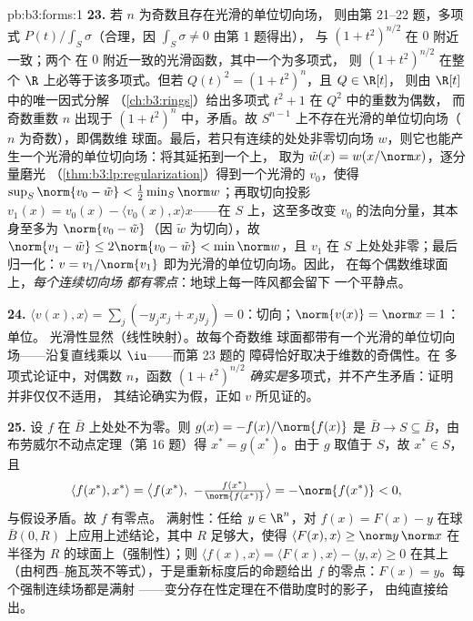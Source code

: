 \begin{solution}{pb:b3:forms:1}
\textbf{23.} 若 $n$ 为奇数且存在光滑的单位切向场，
则由第 21--22 题，多项式
$P(t)/\int_S\sigma$（合理，因 $\int_S\sigma \neq 0$ 由第 1 题得出），
与 $(1 + t^2)^{n/2}$ 在 $0$ 附近一致；两个
在 $0$ 附近一致的光滑函数，其中一个为多项式，
则 $(1 + t^2)^{n/2}$ 在整个
$\R$ 上必等于该多项式。但若 $Q(t)^2 = (1 + t^2)^n$，且 $Q \in \R[t]$，
则由 $\R[t]$ 中的唯一因式分解
（\cref{ch:b3:rings}）给出多项式 $t^2 + 1$ 在 $Q^2$ 中的重数为偶数，
而奇数重数 $n$ 出现于
$(1 + t^2)^n$ 中，矛盾。故
$S^{n-1}$ 上不存在光滑的单位切向场（$n$ 为奇数），即偶数维
球面。最后，若只有连续的处处非零切向场
$w$，则它也能产生一个光滑的单位切向场：将其延拓到一个上，
取为 $\tilde w(x) = w(x/\norm x)$，逐分量磨光
（\cref{thm:b3:lp:regularization}）得到一个光滑的
$v_0$，使得 $\sup_S\norm{v_0 - \tilde w} <
\frac12\min_S\norm w$；再取切向投影 $v_1(x) = v_0(x)
- \langle v_0(x), x\rangle x$——在 $S$ 上，这至多改变 $v_0$
的法向分量，其本身至多为 $\norm{v_0 -
\tilde w}$（因 $\tilde w$ 为切向），故 $\norm{v_1 - \tilde
w} \leq 2\norm{v_0 - \tilde w} < \min\norm w$，且 $v_1$
在 $S$ 上处处非零；最后归一化：$v =
v_1/\norm{v_1}$ 即为光滑的单位切向场。因此，
在每个偶数维球面上，\emph{每个连续切向场
都有零点}：地球上每一阵风都会留下
一个平静点。

\textbf{24.} $\langle v(x), x\rangle = \sum_j(-y_jx_j +
x_jy_j) = 0$：切向；$\norm{v(x)} = \norm x = 1$：单位。
光滑性显然（线性映射）。故每个奇数维
球面都带有一个光滑的单位切向场——沿复直线乘以
$\iu$——而第 23 题的
障碍恰好取决于维数的奇偶性。在
多项式论证中，对偶数 $n$，函数 $(1 +
t^2)^{n/2}$ \emph{确实是}多项式，并不产生矛盾：证明
并非仅仅不适用，
其结论确实为假，正如 $v$ 所见证的。

\textbf{25.} 设 $f$ 在 $\bar B$ 上处处不为零。则
$g(x) = -f(x)/\norm{f(x)}$ 是 $\bar B \to S
\subseteq \bar B$，由布劳威尔不动点定理（第 16 题）得 $x^* =
g(x^*)$。由于 $g$ 取值于 $S$，故 $x^* \in S$，且
\[
\langle f(x^*), x^*\rangle = \bigl\langle f(x^*),\
-\tfrac{f(x^*)}{\norm{f(x^*)}}\bigr\rangle
= -\norm{f(x^*)} < 0,
\]
与假设矛盾。故 $f$ 有零点。
满射性：任给 $y \in \R^n$，对 $f(x) =
F(x) - y$ 在球 $\bar B(0, R)$ 上应用上述结论，其中 $R$ 足够大，使得
$\langle F(x), x\rangle \geq \norm y\,\norm x$ 在半径为
$R$ 的球面上（强制性）；则 $\langle f(x), x\rangle =
\langle F(x), x\rangle - \langle y, x\rangle \geq 0$ 在其上
（由柯西–施瓦茨不等式），于是重新标度后的命题给出
$f$ 的零点：$F(x) = y$。每个强制连续场都是满射
——变分存在性定理在不借助度时的影子，
由纯\omterm{def:b3:topology:topology}{拓扑}直接给出。
\end{solution}
